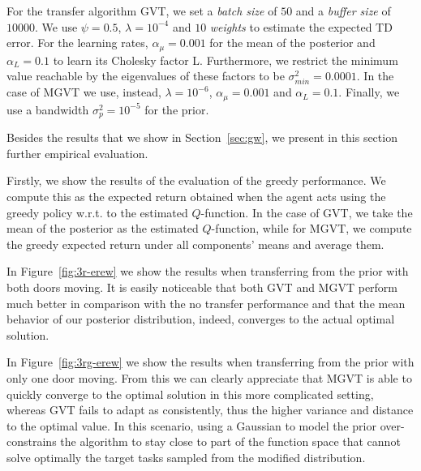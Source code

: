 \documentclass{article}
\begin{document}
For the transfer algorithm GVT, we set a \textit{batch size} of $50$ and a \textit{buffer size} of $10000$. We use $\psi=0.5$, $\lambda=10^{-4}$ and $10$ \textit{weights} to estimate the expected TD error. For the learning rates, $\alpha_{\mu}=0.001$ for the mean of the posterior and $\alpha_{L}=0.1$ to learn its Cholesky factor L. Furthermore, we restrict the minimum value reachable by the eigenvalues of these factors to be $\sigma_{min}^2=0.0001$. In the case of MGVT we use, instead, $\lambda=10^{-6}$, $\alpha_{\mu}=0.001$ and $\alpha_{L}=0.1$. Finally, we use a bandwidth $\sigma_p^2=10^{-5}$ for the prior.

Besides the results that we show in Section~\ref{sec:gw}, we present in this section further empirical evaluation.

Firstly, we show the results of the evaluation of the greedy performance. We compute this as the expected return obtained when the agent acts using the greedy policy w.r.t. to the estimated $Q$-function. In the case of GVT, we take the mean of the posterior as the estimated $Q$-function, while for MGVT, we compute the greedy expected return under all components' means and average them. 

In Figure~\ref{fig:3r-erew} we show the results when transferring from the prior with both doors moving. It is easily noticeable that both GVT and MGVT perform much better in comparison with the no transfer performance and that the mean behavior of our posterior distribution, indeed, converges to the actual optimal solution.

In Figure~\ref{fig:3rg-erew} we show the results when transferring from the prior with only one door moving. From this we can clearly appreciate that MGVT is able to quickly converge to the optimal solution in this more complicated setting, whereas GVT fails to adapt as consistently, thus the higher variance and distance to the optimal value. In this scenario, using a Gaussian to model the prior over-constrains the algorithm to stay close to part of the function space that cannot solve optimally the target tasks sampled from the modified distribution.
\end{document}
